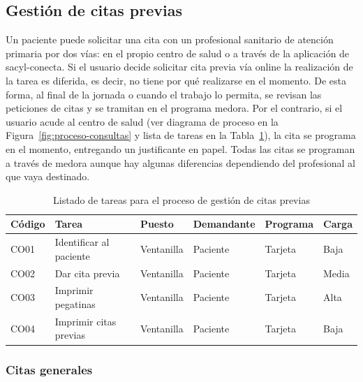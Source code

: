 \subsection{Gestión de citas previas}

Un paciente puede solicitar una cita con un profesional sanitario de atención primaria por dos vías: en el propio centro de salud o a través de la aplicación de \Gls{sacyl-conecta}.
Si el usuario decide solicitar cita previa vía online la realización de la tarea es diferida, es decir, no tiene por qué realizarse en el momento.
De esta forma, al final de la jornada o cuando el trabajo lo permita, se revisan las peticiones de citas y se tramitan en el programa \Gls{medora}.
Por el contrario, si el usuario acude al centro de salud (ver diagrama de proceso en la Figura~\ref{fig:proceso-consultas} y lista de tareas en la Tabla~\ref{tab:proceso-consultas}), la cita se programa en el momento, entregando un justificante en papel.
Todas las citas se programan a través de \Gls{medora} aunque hay algunas diferencias dependiendo del profesional al que vaya destinado.

\begin{table}[H]
    \begin{tabular}{lp{5cm}llll}
        \toprule
        Código & Tarea                   & Puesto     & Demandante & Programa & Carga \\
        \midrule
        CO01   & Identificar al paciente & Ventanilla & Paciente   & Tarjeta  & Baja  \\
        CO02   & Dar cita previa         & Ventanilla & Paciente   & Tarjeta  & Media \\
        CO03   & Imprimir pegatinas      & Ventanilla & Paciente   & Tarjeta  & Alta  \\
        CO04   & Imprimir citas previas  & Ventanilla & Paciente   & Tarjeta  & Baja  \\
        \bottomrule
    \end{tabular}
    \caption{Listado de tareas para el proceso de gestión de citas previas}
    \label{tab:proceso-consultas}
\end{table}

\subsubsection{Citas generales}

